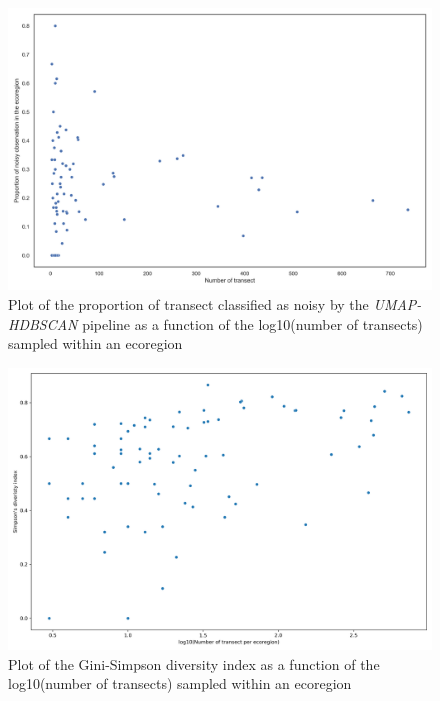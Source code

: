 \begin{figure}
\hypertarget{fig:chap2figS37}{%
\centering
\includegraphics{03-Chapitre2/figures/supplementary/07-prop_noisy_nb_obs.png}
\caption{Plot of the proportion of transect classified as noisy by the
\emph{UMAP-HDBSCAN} pipeline as a function of the log10(number of
transects) sampled within an ecoregion}\label{fig:chap2figS37}
}
\end{figure}

\begin{figure}
\hypertarget{fig:chap2figS38}{%
\centering
\includegraphics{03-Chapitre2/figures/supplementary/07-simpsons_div_nobs.png}
\caption{Plot of the Gini-Simpson diversity index as a function of the
log10(number of transects) sampled within an
ecoregion}\label{fig:chap2figS38}
}
\end{figure}

